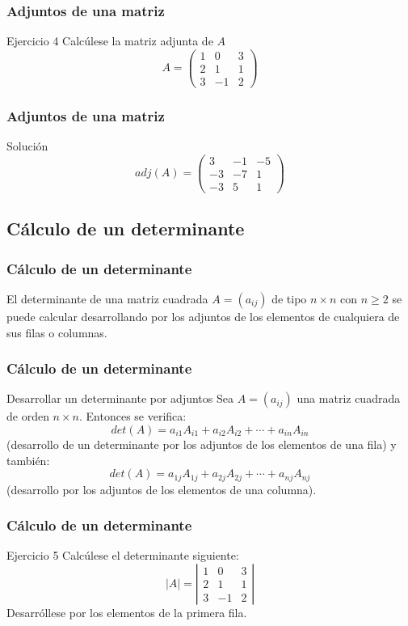 \documentclass[aspectratio=169]{beamer}
\begin{document}
   
    \begin{frame}
  \frametitle{Adjuntos de una matriz}
   \begin{block}{Ejercicio 4}
Calc\'ulese la matriz adjunta de $A$
\[A = \left(\begin{array}{ccc}1 & 0 & 3 \\2 & 1 & 1 \\3 & -1 & 2\end{array}\right)\]
   \end{block}
   \end{frame}
   
       \begin{frame}
  \frametitle{Adjuntos de una matriz}
Soluci\'on
\[adj(A) = \left(\begin{array}{ccc}3 & -1 & -5 \\-3 & -7 & 1 \\-3 & 5 & 1\end{array}\right)\]
   \end{frame}  
  
      \subsection{C\'alculo de un determinante}

       \begin{frame}
  \frametitle{C\'alculo de un determinante}
El determinante de una matriz cuadrada $A = (a_{ij} )$ de tipo $n \times n$ con $n \geq 2$ se puede calcular desarrollando por los adjuntos de los elementos de cualquiera de sus filas o columnas.
   \end{frame}  
  

    \begin{frame}
  \frametitle{C\'alculo de un determinante}
   \begin{block}{Desarrollar un determinante por adjuntos}
Sea  $A = (a_{ij} )$ una matriz cuadrada de orden $n \times n$. Entonces se verifica:
\[det(A) = a_{i1}A_{i1} + a_{i2}A_{i2} + \cdots + a_{in}A_{in}\]
(desarrollo de un determinante por los adjuntos de los elementos de una fila) y tambi\'en:
\[det(A)=a_{1j}A_{1j} +a_{2j}A_{2j} +\cdots+a_{nj}A_{nj}\]
(desarrollo por los adjuntos de los elementos de una columna).
   \end{block}
   \end{frame}

\begin{frame}
  \frametitle{C\'alculo de un determinante}
     \begin{block}{Ejercicio 5}
Calc\'ulese el determinante siguiente:
\[|A| = \left|\begin{array}{ccc}1 & 0 & 3 \\2 & 1 & 1 \\3 & -1 & 2\end{array}\right|\]
Desarr\'ollese por los elementos de la primera fila.
\end{block}
\end{frame} 
\end{document}
